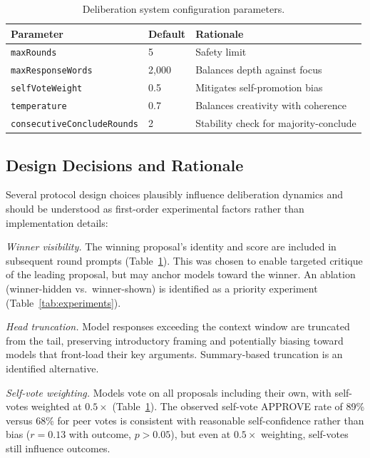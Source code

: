 \documentclass[11pt,a4paper]{article}
\begin{document}
\begin{table}[ht]
\centering
\caption{Deliberation system configuration parameters.}
\label{tab:config}
\begin{tabular}{@{}llp{5.5cm}@{}}
\toprule
\textbf{Parameter} & \textbf{Default} & \textbf{Rationale} \\
\midrule
\texttt{maxRounds} & 5 & Safety limit \\
\texttt{maxResponseWords} & 2{,}000 & Balances depth against focus \\
\texttt{selfVoteWeight} & 0.5 & Mitigates self-promotion bias \\
\texttt{temperature} & 0.7 & Balances creativity with coherence \\
\texttt{consecutiveConcludeRounds} & 2 & Stability check for majority-conclude \\
\bottomrule
\end{tabular}
\end{table}

\subsection{Design Decisions and Rationale}
\label{sec:design_decisions}

Several protocol design choices plausibly influence deliberation dynamics and should be understood as first-order experimental factors rather than implementation details:

\textit{Winner visibility.} The winning proposal's identity and score are included in subsequent round prompts (Table~\ref{tab:config}). This was chosen to enable targeted critique of the leading proposal, but may anchor models toward the winner. An ablation (winner-hidden vs.\ winner-shown) is identified as a priority experiment (Table~\ref{tab:experiments}).

\textit{Head truncation.} Model responses exceeding the context window are truncated from the tail, preserving introductory framing and potentially biasing toward models that front-load their key arguments. Summary-based truncation is an identified alternative.

\textit{Self-vote weighting.} Models vote on all proposals including their own, with self-votes weighted at $0.5\times$ (Table~\ref{tab:config}). The observed self-vote APPROVE rate of 89\% versus 68\% for peer votes is consistent with reasonable self-confidence rather than bias ($r = 0.13$ with outcome, $p > 0.05$), but even at $0.5\times$ weighting, self-votes still influence outcomes.
\end{document}
